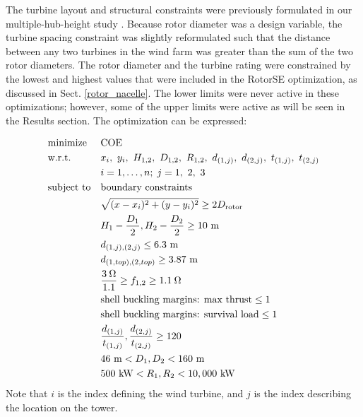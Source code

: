 \documentclass[WESD, manuscript]{copernicus}
\begin{document}
          The turbine layout and structural constraints were previously formulated in our multiple-hub-height study \citep{stanley2018}. Because rotor diameter was a design variable, the turbine spacing constraint was slightly reformulated such that the distance between any two turbines in the wind farm was greater than the sum of the two rotor diameters.
           The rotor diameter and the turbine rating were constrained by the lowest and highest values that were included in the RotorSE optimization, as discussed in Sect. \ref{rotor_nacelle}.
           The lower limits were never active in these optimizations; however, some of the upper limits were active as will be seen in the Results section.
       The optimization can be expressed:
        
        
        \begin{equation}
			\begin{aligned}
				& \text{minimize}
					& & \text{COE} \\
                & \text{w.r.t.} 
                	&& x_i,~ y_i,~ H_{1,2},~ D_{1,2},~ R_{1,2},~ d_{(1,j)},~ d_{(2,j)},~ t_{(1,j)},~t_{(2,j)}\\
                		&&& i = 1, \ldots, n; \; j = 1,~2,~3 \\
				& \text{subject to}
					& & \text{boundary constraints} \\
						&&& \sqrt{(x-x_i)^2+(y-y_i)^2} \geq 2D_{\text{rotor}} \\
						&&& H_1-\frac{D_1}{2}, H_2-\frac{D_2}{2} \geq 10~ \text{m}\\
                		&&& d_{(1,j),(2,j)} \leq 6.3~ \text{m}\\
                		&&& d_{(1,top),(2,top)} \geq 3.87~ \text{m}\\
						&&& \frac{3\hspace{0.08cm}\Omega}{1.1} \geq f_{1,2} \geq 1.1\hspace{0.08cm}\Omega \\
                		&&& \text{shell buckling margins: max thrust} \leq 1 \\
                        &&& \text{shell buckling margins: survival load} \leq 1 \\
                		&&& \frac{d_{(1,j)}}{t_{(1,j)}},\frac{d_{(2,j)}}{t_{(2,j)}} \geq 120\\
                        &&& 46~ \text{m} < D_1,D_2 < 160~ \text{m}  \\
                        &&& 500~ \text{kW} < R_1,R_2 < 10,000~ \text{kW} \\
			\end{aligned}
		\end{equation}
%
Note that $i$ is the index defining the wind turbine, and $j$ is the index describing the location on the tower.
        
\end{document}
